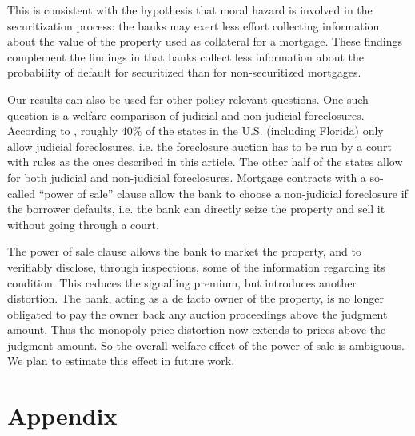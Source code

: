 \documentclass[11pt,twopage]{article}
\begin{document}
This is consistent with the hypothesis that moral
hazard is involved in the securitization process: the banks 
may exert less effort collecting information about the value of the
property used as collateral for a mortgage. These findings complement
the findings in \cite{keys2008did} that banks collect less information
about the probability of default for securitized than for
non-securitized mortgages.



Our results can also be used for other policy relevant questions. One such
question is a welfare comparison of judicial and non-judicial foreclosures.
According to \cite{nelson2004reforming}, roughly $40\%$ of the states
in the U.S. (including Florida) only allow judicial foreclosures,
i.e. the foreclosure auction has to be run by a court with rules as
the ones described in this article. The other half of the states allow
for both judicial and non-judicial foreclosures.  Mortgage contracts
with a so-called ``power of sale'' clause allow the bank to choose a
non-judicial foreclosure if the borrower defaults, i.e. the bank
can directly seize the property and sell it without going through a
court.

The power of sale clause allows the bank to market the property, and
to verifiably disclose, through inspections, some of the information
regarding its condition. This reduces the signalling premium, but
introduces another distortion. The bank, acting as a de facto owner of
the property, is no longer obligated to pay the owner back any auction
proceedings above the judgment amount. Thus the monopoly price
distortion now extends to prices above the judgment amount. So the
overall welfare effect of the power of sale is ambiguous. We plan to
estimate this effect in future work.



%  
% 

\appendix
\section*{Appendix}
\end{document}
